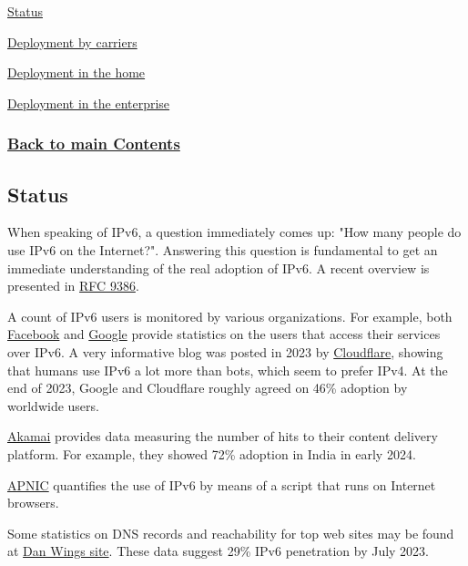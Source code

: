 \documentclass[
]{article}
\begin{document}
\hyperref[status]{Status}

\hyperref[deployment-by-carriers]{Deployment by carriers}

\hyperref[deployment-in-the-home]{Deployment in the home}

\hyperref[deployment-in-the-enterprise]{Deployment in the enterprise}

\subsubsection{\texorpdfstring{\hyperref[list-of-contents]{Back to main
Contents}}{Back to main Contents}}\label{back-to-main-contents-7}

\pagebreak

\subsection{Status}\label{status}

When speaking of IPv6, a question immediately comes up: "How many people
do use IPv6 on the Internet?". Answering this question is fundamental to
get an immediate understanding of the real adoption of IPv6. A recent
overview is presented in
\href{https://www.rfc-editor.org/info/rfc9386}{RFC 9386}.

A count of IPv6 users is monitored by various organizations. For
example, both
\href{https://www.facebook.com/ipv6/?tab=ipv6_total_adoption}{Facebook}
and \href{https://www.google.com/intl/en/ipv6/statistics.html}{Google}
provide statistics on the users that access their services over IPv6. A
very informative blog was posted in 2023 by
\href{https://blog.cloudflare.com/ipv6-from-dns-pov}{Cloudflare},
showing that humans use IPv6 a lot more than bots, which seem to prefer
IPv4. At the end of 2023, Google and Cloudflare roughly agreed on 46\%
adoption by worldwide users.

\href{https://www.akamai.com/internet-station/cyber-attacks/state-of-the-internet-report/ipv6-adoption-visualization}{Akamai}
provides data measuring the number of hits to their content delivery
platform. For example, they showed 72\% adoption in India in early 2024.

\href{https://stats.labs.apnic.net/ipv6}{APNIC} quantifies the use of
IPv6 by means of a script that runs on Internet browsers.

Some statistics on DNS records and reachability for top web sites may be
found at \href{https://www.employees.org/~dwing/aaaa-stats/}{Dan
Wing\textquotesingle s site}. These data suggest 29\% IPv6 penetration
by July 2023.
\end{document}
